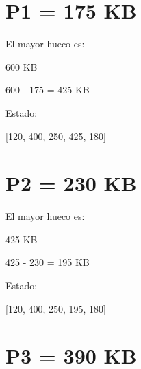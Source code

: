 \documentclass[
  spanish,
  letterpaper,
]{scrbook}
\newenvironment{Shaded}{\begin{snugshade}}{\end{snugshade}}
\newcommand{\NormalTok}[1]{\textcolor[rgb]{0.00,0.23,0.31}{#1}}
\begin{document}
\section{P1 = 175 KB}\label{p1-175-kb-2}

El mayor hueco es:

\begin{Shaded}
\begin{Highlighting}[]
\NormalTok{600 KB}
\end{Highlighting}
\end{Shaded}

\begin{Shaded}
\begin{Highlighting}[]
\NormalTok{600 {-} 175 = 425 KB}
\end{Highlighting}
\end{Shaded}

Estado:

\begin{Shaded}
\begin{Highlighting}[]
\NormalTok{[120, 400, 250, 425, 180]}
\end{Highlighting}
\end{Shaded}

\section{P2 = 230 KB}\label{p2-230-kb-2}

El mayor hueco es:

\begin{Shaded}
\begin{Highlighting}[]
\NormalTok{425 KB}
\end{Highlighting}
\end{Shaded}

\begin{Shaded}
\begin{Highlighting}[]
\NormalTok{425 {-} 230 = 195 KB}
\end{Highlighting}
\end{Shaded}

Estado:

\begin{Shaded}
\begin{Highlighting}[]
\NormalTok{[120, 400, 250, 195, 180]}
\end{Highlighting}
\end{Shaded}

\section{P3 = 390 KB}\label{p3-390-kb-2}
\end{document}

